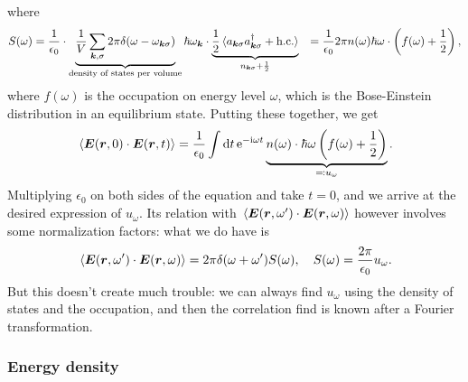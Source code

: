 \documentclass[hyperref, a4paper]{article}
\newcommand*{\ii}{\mathrm{i}}
\newcommand*{\ee}{\mathrm{e}}
\def\\{}%
\begin{document}
where 
\begin{equation}
    \begin{aligned}
        S(\omega) &= 
        \frac{1}{\epsilon_0} \cdot 
        \underbrace{\frac{1}{V} \sum_{\vb*{k}, \sigma} 2\pi \delta(\omega - \omega_{\vb*{k} \sigma})}_{
            \text{density of states per volume}
        }
        \hbar \omega_{\vb*{k}} 
        \cdot \underbrace{\frac{1}{2}  \expval*{a_{\vb*{k} \sigma} a^\dagger_{\vb*{k} \sigma} + \text{h.c.}}}_{
            n_{\vb*{k} \sigma} + \frac{1}{2}
        } \\
        &= \frac{1}{\epsilon_0} 2\pi n(\omega) \hbar \omega \cdot \left(
            f(\omega) + \frac{1}{2}
        \right),
    \end{aligned}
\end{equation}
where $f(\omega)$ is the occupation on energy level $\omega$,
which is the Bose-Einstein distribution in an equilibrium state. 
Putting these together, we get 
\begin{equation}
    \expval*{\vb*{E}(\vb*{r}, 0) \cdot \vb*{E}(\vb*{r}, t)} = 
    \frac{1}{\epsilon_0} \int \dd{t} \ee^{- \ii \omega t} \underbrace{
        n(\omega) \cdot \hbar {\omega} \left(
        f(\omega) + \frac{1}{2}
        \right)
    }_{\eqqcolon u_\omega}.
    \label{eq:u-omega-to-correlation}
\end{equation}
Multiplying $\epsilon_0$ on both sides of the equation and 
take $t = 0$, 
and we arrive at the desired expression of $u_\omega$. 
Its relation with $\expval*{\vb*{E}(\vb*{r}, \omega') \cdot \vb*{E}(\vb*{r}, \omega)}$ however 
involves some normalization factors: 
what we do have is 
\begin{equation}
    \expval*{\vb*{E}(\vb*{r}, \omega') \cdot \vb*{E}(\vb*{r}, \omega)} = 2 \pi \delta(\omega + \omega') S(\omega), \quad 
    S(\omega) = \frac{2\pi}{\epsilon_0} u_\omega.  
\end{equation}
But this doesn't create much trouble: 
we can always find $u_\omega$ 
using the density of states and the occupation, 
and then the correlation find is known
after a Fourier transformation. 

\subsubsection{Energy density}\label{sec:correlation.energy.density}
\end{document}
